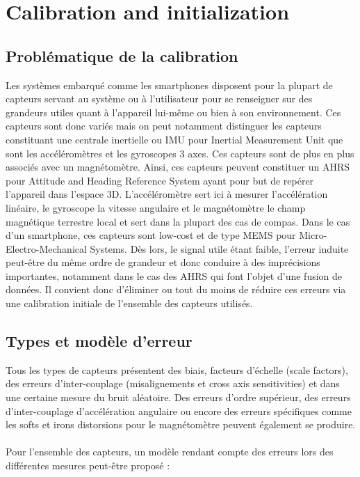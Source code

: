 \section{Calibration and initialization}

\subsection{Probl\'ematique de la calibration}

	Les syst\`emes embarqu\'e comme les smartphones disposent pour la plupart de capteurs servant au syst\`eme ou \`a l'utilisateur pour se renseigner sur des grandeurs utiles quant \`a l'appareil lui-m\^eme ou bien \`a son environnement. Ces capteurs sont donc vari\'es mais on peut notamment distinguer les capteurs constituant une centrale inertielle ou IMU pour Inertial Measurement Unit que sont les acc\'el\'erom\`etres et les gyroscopes 3 axes. Ces capteurs sont de plus en plus associ\'es avec un magn\'etom\`etre. Ainsi, ces capteurs peuvent constituer un AHRS pour Attitude and Heading Reference System ayant pour but de rep\'erer l'appareil dans l'espace 3D. L'acc\'el\'erom\`etre sert ici \`a mesurer l'acc\'el\'eration lin\'eaire, le gyroscope la vitesse angulaire et le magn\'etom\`etre le champ magn\'etique terrestre local et sert dans la plupart des cas de compas. Dans le cas d'un smartphone, ces capteurs sont low-cost et de type MEMS pour Micro-Electro-Mechanical Systems. D\`es lors, le signal utile \'etant faible, l'erreur induite peut-\^etre du m\^eme ordre de grandeur et donc conduire \`a des impr\'ecisions importantes, notamment dans le cas des AHRS qui font l'objet d'une fusion de donn\'ees. Il convient donc d'\'eliminer ou tout du moins de r\'eduire ces erreurs via une calibration initiale de l'ensemble des capteurs utilis\'es.

\subsection{Types et mod\`ele d'erreur}

	Tous les types de capteurs pr\'esentent des biais, facteurs d'\'echelle (scale factors), des erreurs d'inter-couplage (misalignements et cross axis sensitivities) et dans une certaine mesure du bruit al\'eatoire. Des erreurs d'ordre sup\'erieur, des erreurs d'inter-couplage d'acc\'el\'eration angulaire ou encore des erreurs sp\'ecifiques comme les softs et irons distorsions pour le magn\'etom\`etre peuvent \'egalement se produire.
\\
\\
Pour l'ensemble des capteurs, un mod\`ele rendant compte des erreurs lors des diff\'erentes mesures peut-\^etre propos\'e :

